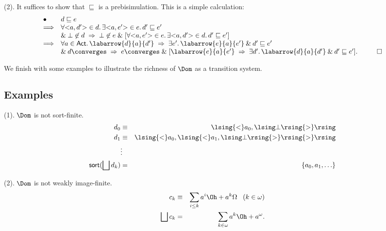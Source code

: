 \noindent (2). It suffices to show that $\sqsubseteq$ is a prebisimulation.
This is a simple calculation:
\[ \begin{array}{ll}
\bullet & d \sqsubseteq e \\
\Longrightarrow &  \forall {<}a, d' {>} \in d . \, \exists {<}a,
e' {>} \in e . \, d' \sqsubseteq e' \\
& \& \: \bot \not\in d \; \Rightarrow \; \bot \not\in e 
\; \& \; [ \forall {<}a, e' {>} \in e . \, \exists {<}a, d' {>} \in d . \, d'
\sqsubseteq e'] \\
\Longrightarrow & \forall a \in {\sf Act} . \, \labarrow{d}{a}{d'} \; \Rightarrow \;
\exists e' . \, \labarrow{e}{a}{e'} \: \& \: d' \sqsubseteq e' \\
& \& \: d \converges \; \Rightarrow \; e \converges 
\; \& \; [ \labarrow{e}{a}{e'} \; \Rightarrow \; \exists d' . \,
\labarrow{d}{a}{d'} \: \& \: d' \sqsubseteq e' ] . \;\;\; \qed
\end{array} \]

We finish with some examples to illustrate the richness of $\Dom$ as a
transition system.

\subsection*{Examples}

(1). $\Dom$ is not sort-finite.
\begin{eqnarray*}
d_{0} & \equiv & \lsing {<} a_{0} , \lsing \bot \rsing {>}  \rsing \\
d_{1} & \equiv & \lsing {<}a_{0} , \lsing {<} a_{1}, \lsing \bot \rsing {>}
\rsing {>} \rsing \\
& \vdots & \\
{\sf sort}( \bigsqcup d_{k} ) & = &  \{ a_{0}, a_{1} , \ldots \} 
\end{eqnarray*}

\noindent (2). $\Dom$ is not weakly image-finite.
\begin{eqnarray*}
c_{k} & \equiv & {\sum_{i \leq k} a^{i} \Oh } + a^{k} \Omega \;\;\; (k \in
\omega ) \\
\bigsqcup c_{k} & = & { \sum_{k \in \omega} a^{k} \Oh } + a^{\omega} .
\end{eqnarray*}



